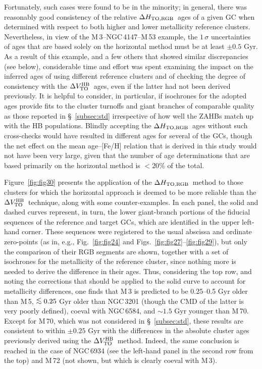 \documentclass[12pt,preprint]{aastex}
\newcommand\delv{\Delta V^{\rm HB}_{\rm TO}}
\newcommand\delc{\Delta H_{\rm TO,RGB}}
\newcommand\lta{\mathrel{\hbox{\raise 0.6 ex \hbox{$<$}\kern
                   -1.8 ex\lower .5 ex\hbox{$\sim$}}}}
\begin{document}
Fortunately, such cases were found to be in the minority; in general, there was
reasonably good consistency of the relative $\delc$\ ages of a given GC when
determined with respect to both higher and lower metallicity reference clusters.
Nevertheless, in view of the M$\,$3--NGC$\,$4147--M$\,$53 example, the
$1\,\sigma$ uncertainties of ages that are based solely on the horizontal method
must be at least $\pm 0.5$ Gyr.  As a result of this example, and a few others
that showed similar discrepancies (see below), considerable time and effort was
spent examining the impact on the inferred ages of using different reference
clusters and of checking the degree of consistency with the $\delv$\ ages, even
if the latter had not been derived previously.  It is helpful to consider, in
particular, if isochrones for the adopted ages provide fits to the cluster
turnoffs and giant branches of comparable quality as those reported in 
\S~\ref{subsec:std} irrespective of how well the ZAHBs match up with the HB
populations.  Blindly accepting the $\delc$\ ages without such cross-checks
would have resulted in different ages for several of the GCs, though the net
effect on the mean age--[Fe/H] relation that is derived in this study would not
have been very large, given that the number of age determinations that are
based primarily on the horizontal method is $< 20$\% of the total.

Figure~\ref{fig:fig30} presents the application of the $\delc$\ method to those
clusters for which the horizontal approach is deemed to be more reliable than
the $\delv$\ technique, along with some counter-examples.  In each panel, the
solid and dashed curves represent, in turn, the lower giant-branch portions of
the fiducial sequences of the reference and target GCs, which are identified in
the upper left-hand corner.  These sequences were registered to the usual
abscissa and ordinate zero-points (as in, e.g., Fig.~\ref{fig:fig24} and
Figs.~\ref{fig:fig27}--\ref{fig:fig29}), but only the comparison of their RGB
segments are shown, together with a set of isochrones for the metallicity of the
reference cluster, since nothing more is needed to derive the difference in
their ages.  Thus, considering the top row, and noting the corrections that
should be applied to the solid curve to account for metallicity differences,
one finds that M$\,$3 is predicted to be 0.25--0.5 Gyr older than M$\,$5,
$\lta 0.25$ Gyr older than NGC$\,$3201 (though the CMD of the latter is very 
poorly defined), coeval with NGC$\,$6584, and $\sim 1.5$ Gyr younger than
M$\,$70.  Except for M$\,$70, which was not considered in
\S~\ref{subsec:std}, these results are consistent to within $\pm 0.25$ Gyr with
the differences in the absolute cluster ages previously derived using the
$\delv$\ method.  Indeed, the same conclusion is reached in the case of
NGC$\,$6934 (see the left-hand panel in the second row from the top) and
M$\,$72 (not shown, but which is clearly coeval with M$\,$3).
\end{document}
